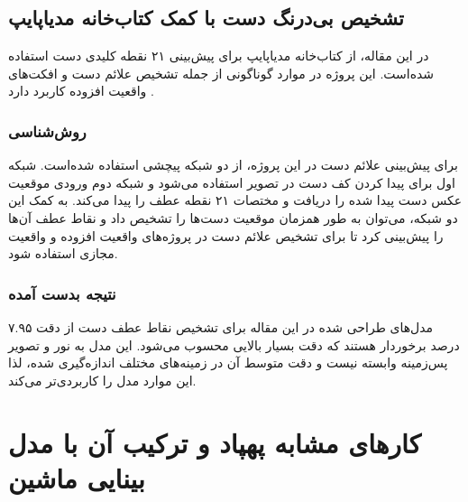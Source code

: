\subsection{تشخیص بی‌درنگ دست با کمک کتاب‌خانه مدیاپایپ}
در این مقاله، از کتاب‌خانه مدیا‌پایپ  برای پیش‌بینی ۲۱ نقطه کلیدی دست استفاده‌ ‌شده‌است. این پروژه در موارد گوناگونی از جمله تشخیص علائم دست و افکت‌های واقعیت افزوده  کاربرد دارد \cite{zhang2020mediapipe}.

\subsubsection{روش‌شناسی}
 برای پیش‌بینی علائم دست  در این پروژه، از دو شبکه  پیچشی استفاده شده‌است. شبکه اول برای پیدا کردن کف دست در تصویر استفاده می‌شود و شبکه دوم ورودی 
موقعیت عکس دست پیدا شده را دریافت و مختصات ۲۱ نقطه عطف را پیدا می‌کند. به کمک این دو شبکه، می‌توان به طور همزمان موقعیت دست‌ها را تشخیص داد و 
نقاط عطف آن‌ها را پیش‌بینی کرد تا برای تشخیص علائم دست در پروژه‌های واقعیت افزوده و واقعیت مجازی استفاده شود.

\subsubsection{نتیجه بدست آمده}
مدل‌های طراحی شده در این مقاله برای تشخیص نقاط عطف دست از دقت ۷.۹۵ درصد برخوردار هستند که دقت بسیار بالایی محسوب می‌شود. این مدل به نور و تصویر پس‌زمینه 
وابسته نیست و دقت متوسط آن در زمینه‌های مختلف اندازه‌گیری شده، لذا این موارد مدل را کاربردی‌تر می‌کند.




\section{کارهای مشابه پهپاد و ترکیب آن با مدل بینایی ماشین}

